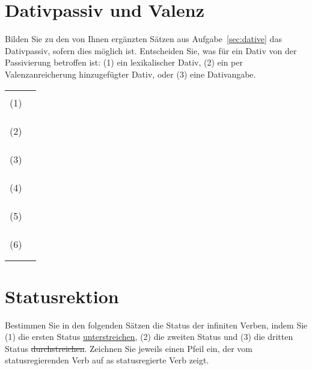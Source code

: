 \section{Dativpassiv und Valenz}\label{sec:dativpassiv}

Bilden Sie zu den von Ihnen ergänzten Sätzen aus Aufgabe~\ref{sec:dative} das Dativpassiv, sofern dies möglich ist.
Entscheiden Sie, was für ein Dativ von der Passivierung betroffen ist: (1) ein lexikalischer Dativ, (2) ein per Valenzanreicherung hinzugefügter Dativ, oder (3) eine Dativangabe.

\begin{center}
  \begin{longtable}[h]{cp{}}
    &\\
    (1) & \\\cline{2-2}
    &\\
    &\\\cline{2-2}
    &\\
    (2) & \\\cline{2-2}
    &\\
    &\\\cline{2-2}
    &\\
    (3) & \\\cline{2-2}
    &\\
    &\\\cline{2-2}
    &\\
    (4) & \\\cline{2-2}
    &\\
    &\\\cline{2-2}
    &\\
    (5) & \\\cline{2-2}
    &\\
    &\\\cline{2-2}
    &\\
    (6) & \\\cline{2-2}
    &\\
    &\\\cline{2-2}
  \end{longtable}
\end{center}

\newpage

\section{Statusrektion}

Bestimmen Sie in den folgenden Sätzen die Status der infiniten Verben, indem Sie (1) die ersten Status \ul{unterstreichen}, (2) die zweiten Status  und (3) die dritten Status \sout{durchstreichen}.
Zeichnen Sie jeweils einen Pfeil ein, der vom statusregierenden Verb auf as statusregierte Verb zeigt.

